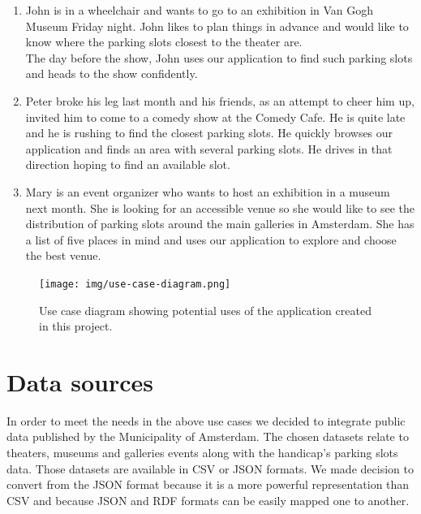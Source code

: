 \documentclass[runningheads,a4paper]{../../StyleFiles/llncs}
\begin{document}
\begin{enumerate}
	\item John is in a wheelchair and wants to go to an exhibition in Van Gogh Museum Friday night. John likes to plan things in advance and would like to know where the parking slots closest to the theater are. \\
	The day before the show, John uses our application to find such parking slots and heads to the show confidently. 
	\item Peter broke his leg last month and his friends, as an attempt to cheer him up, invited him to come to a comedy show at the Comedy Cafe. He is quite late and he is rushing to find the closest parking slots. He quickly browses our application and finds an area with several parking slots. He drives in that direction hoping to find an available slot. 
	\item Mary is an event organizer who wants to host an exhibition in a museum next month. She is looking for an accessible venue so she would like to see the distribution of parking slots around the main galleries in Amsterdam. She has a list of five places in mind and uses our application to explore and choose the best venue.
\end{enumerate}

\begin{figure}[ht]
	\centering
	\texttt{[image: img/use-case-diagram.png]}
	\caption{Use case diagram showing potential uses of the application created in this project.}
	\label{fig:use-case}
\end{figure}

\section{Data sources}
In order to meet the needs in the above use cases we decided to integrate public data published by the Municipality of Amsterdam. The chosen datasets relate to theaters, museums and galleries events along with the handicap's parking slots data. Those datasets are available in CSV or JSON formats. We made decision to convert from the JSON format because it is a more powerful representation than CSV and because JSON and RDF formats can be easily mapped one to another.
\end{document}
